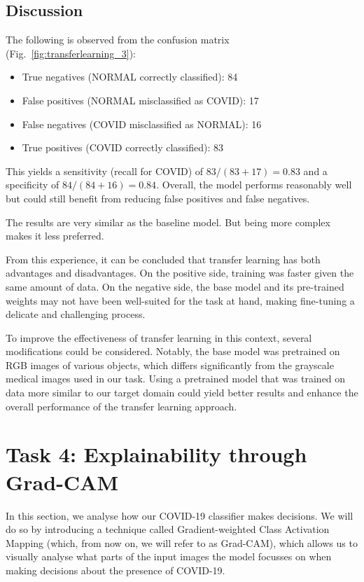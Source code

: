 \documentclass[conference]{IEEEtran}
\begin{document}
\subsection{Discussion}
The following is observed from the confusion matrix (Fig.~\ref{fig:transferlearning_3}):

\begin{itemize}
	\item True negatives (NORMAL correctly classified): 84
	\item False positives (NORMAL misclassified as COVID): 17
	\item False negatives (COVID misclassified as NORMAL): 16
	\item True positives (COVID correctly classified): 83
\end{itemize}
\vspace{0.5cm}

This yields a sensitivity (recall for COVID) of $83/(83+17)=0.83$ and a specificity of $84/(84+16)=0.84$. Overall, the model performs reasonably well but could still benefit from reducing false positives and false negatives. 

The results are very similar as the baseline model. But being more complex makes it less preferred.

From this experience, it can be concluded that transfer learning has both advantages and disadvantages. On the positive side, training was faster given the same amount of data. On the negative side, the base model and its pre-trained weights may not have been well-suited for the task at hand, making fine-tuning a delicate and challenging process.

To improve the effectiveness of transfer learning in this context, several modifications could be considered. Notably, the base model was pretrained on RGB images of various objects, which differs significantly from the grayscale medical images used in our task. Using a pretrained model that was trained on data more similar to our target domain could yield better results and enhance the overall performance of the transfer learning approach.

\section{Task 4: Explainability through Grad-CAM} \label{sec:task_4}
In this section, we analyse how our COVID-19 classifier makes decisions. We will do so by introducing a technique called Gradient-weighted Class Activation Mapping (which, from now on, we will refer to as Grad-CAM), which allows us to visually analyse what parts of the input images the model focusses on when making decisions about the presence of COVID-19.
\end{document}
